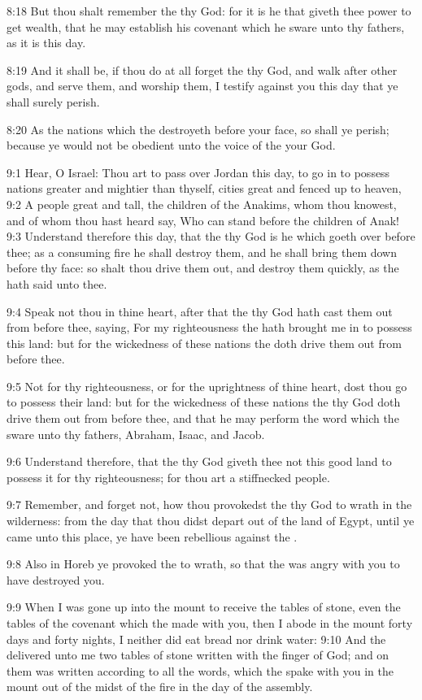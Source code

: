 8:18 But thou shalt remember the \LORD thy God: for it is he that
giveth thee power to get wealth, that he may establish his covenant
which he sware unto thy fathers, as it is this day.

8:19 And it shall be, if thou do at all forget the \LORD thy God, and
walk after other gods, and serve them, and worship them, I testify
against you this day that ye shall surely perish.

8:20 As the nations which the \LORD destroyeth before your face, so
shall ye perish; because ye would not be obedient unto the voice of
the \LORD your God.

9:1 Hear, O Israel: Thou art to pass over Jordan this day, to go in to
possess nations greater and mightier than thyself, cities great and
fenced up to heaven, 9:2 A people great and tall, the children of the
Anakims, whom thou knowest, and of whom thou hast heard say, Who can
stand before the children of Anak!  9:3 Understand therefore this day,
that the \LORD thy God is he which goeth over before thee; as a
consuming fire he shall destroy them, and he shall bring them down
before thy face: so shalt thou drive them out, and destroy them
quickly, as the \LORD hath said unto thee.

9:4 Speak not thou in thine heart, after that the \LORD thy God hath
cast them out from before thee, saying, For my righteousness the \LORD
hath brought me in to possess this land: but for the wickedness of
these nations the \LORD doth drive them out from before thee.

9:5 Not for thy righteousness, or for the uprightness of thine heart,
dost thou go to possess their land: but for the wickedness of these
nations the \LORD thy God doth drive them out from before thee, and
that he may perform the word which the \LORD sware unto thy fathers,
Abraham, Isaac, and Jacob.

9:6 Understand therefore, that the \LORD thy God giveth thee not this
good land to possess it for thy righteousness; for thou art a
stiffnecked people.

9:7 Remember, and forget not, how thou provokedst the \LORD thy God to
wrath in the wilderness: from the day that thou didst depart out of
the land of Egypt, until ye came unto this place, ye have been
rebellious against the \LORD.

9:8 Also in Horeb ye provoked the \LORD to wrath, so that the \LORD was
angry with you to have destroyed you.

9:9 When I was gone up into the mount to receive the tables of stone,
even the tables of the covenant which the \LORD made with you, then I
abode in the mount forty days and forty nights, I neither did eat
bread nor drink water: 9:10 And the \LORD delivered unto me two tables
of stone written with the finger of God; and on them was written
according to all the words, which the \LORD spake with you in the mount
out of the midst of the fire in the day of the assembly.

